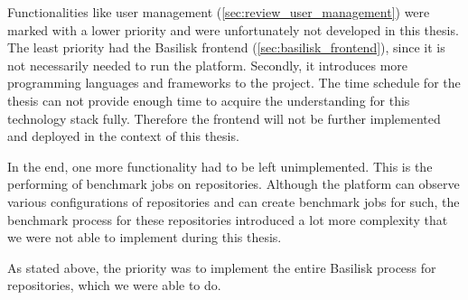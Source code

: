 Functionalities like user management (\ref{sec:review_user_management}) were marked with a lower priority and were unfortunately not developed in this thesis.
The least priority had the Basilisk frontend (\ref{sec:basilisk_frontend}), since it is not necessarily needed to run the platform.
Secondly, it introduces more programming languages and frameworks to the project.
The time schedule for the thesis can not provide enough time to acquire the understanding for this technology stack fully.
Therefore the frontend will not be further implemented and deployed in the context of this thesis.

In the end, one more functionality had to be left unimplemented.
This is the performing of benchmark jobs on \gh{} repositories.
Although the platform can observe various configurations of \gh{} repositories and can create benchmark jobs for such, the benchmark process for these repositories introduced a lot more complexity that we were not able to implement during this thesis.

As stated above, the priority was to implement the entire Basilisk process for \dockh{} repositories, which we were able to do.









	